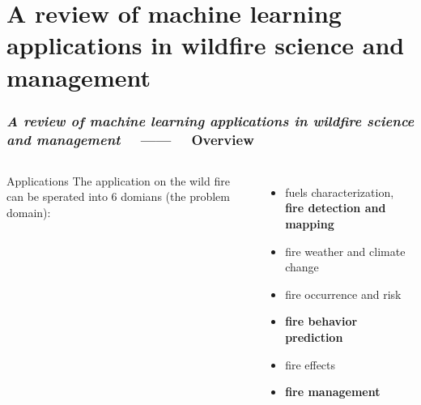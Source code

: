 \section{A review of machine learning applications in wildfire science and
management}

\begin{frame}
    \frametitle{\textit{A review of machine learning applications in wildfire
    science and management} ~~------~~ Overview}
    \begin{columns}[t]
        \begin{block}{Applications}
            The application on the wild fire can be sperated into 6 domians
            (the problem domain):
        \end{block}
        \begin{itemize}
            \item fuels characterization, \textbf{fire detection and mapping}
            \item fire weather and climate change
            \item fire occurrence and risk
            \item \textbf{fire behavior prediction}
            \item fire effects
            \item \textbf{fire management}
        \end{itemize}


\end{columns}
\end{frame}
